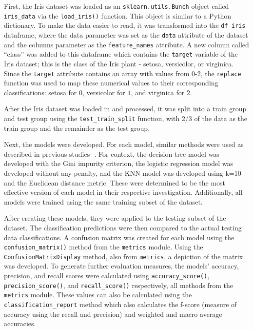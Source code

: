 \documentclass[journal]{IEEEtran}
\begin{document}
First, the Iris dataset was loaded as an \lstinline{sklearn.utils.Bunch} object called \lstinline{iris_data} via the \lstinline{load_iris()} function. This object is similar to a Python dictionary. To make the data easier to read, it was transformed into the \lstinline{df_iris} dataframe, where the data parameter was set as the \lstinline{data} attribute of the dataset and the columns parameter as the \lstinline{feature_names} attribute. A new column called “class” was added to this dataframe which contains the \lstinline{target} variable of the Iris dataset; this is the class of the Iris plant - setosa, versicolor, or virginica. Since the \lstinline{target} attribute contains an array with values from 0-2, the \lstinline{replace} function was used to map these numerical values to their corresponding classifications: setosa for \(0\), versicolor for \(1\), and virginica for \(2\). 

After the Iris dataset was loaded in and processed, it was split into a train group and test group using the \lstinline{test_train_split} function, with 2/3 of the data as the train group and the remainder as the test group. 

Next, the models were developed. For each model, similar methods were used as described in previous studies \cite{b1}-\cite{b3}. For context, the decision tree model was developed with the Gini impurity criterion, the logistic regression model was developed without any penalty, and the KNN model was developed using k=10 and the Euclidean distance metric. These were determined to be the most effective version of each model in their respective investigation. Additionally, all models were trained using the same training subset of the dataset.

After creating these models, they were applied to the testing subset of the dataset. The  classification predictions were then compared to the actual testing data classifications. A confusion matrix was created for each model using the \lstinline{confusion_matrix()} method from the \lstinline{metrics} module. Using the \lstinline{ConfusionMatrixDisplay} method, also from \lstinline{metrics}, a depiction of the matrix was developed. To generate further evaluation measures, the models' accuracy, precision, and recall scores were calculated using \lstinline{accuracy_score()}, \lstinline{precision_score()}, and \lstinline{recall_score()} respectively, all methods from the \lstinline{metrics} module. These values can also be calculated using the \lstinline{classification_report} method which also calculates the f-score (measure of accuracy using the recall and precision) and weighted and macro average accuracies. 
\end{document}
